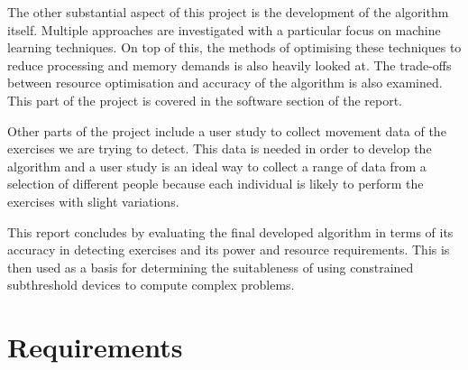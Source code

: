 The other substantial aspect of this project is the development of the algorithm itself. Multiple approaches are investigated with a particular focus on machine learning techniques. On top of this, the methods of optimising these techniques to reduce processing and memory demands is also heavily looked at. The trade-offs between resource optimisation and accuracy of the algorithm is also examined.  This part of the project is covered in the software section of the report.

Other parts of the project include a user study to collect movement data of the exercises we are trying to detect. This data is needed in order to develop the algorithm and a user study is an ideal way to collect a range of data from a selection of different people because each individual is likely to perform the exercises with slight variations.

This report concludes by evaluating the final developed algorithm in terms of its accuracy in detecting exercises and its power and resource requirements. This is then used as a basis for determining the suitableness of using constrained subthreshold devices to compute complex problems.


\section{Requirements}

